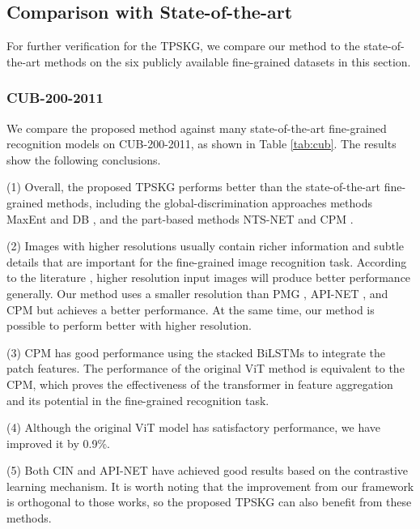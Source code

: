 \documentclass[5p,twocolumn]{elsarticle}
\begin{document}
\subsection{Comparison with State-of-the-art}
For further verification for the TPSKG, we compare our method to the state-of-the-art methods on the six publicly available fine-grained datasets in this section.

\subsubsection{\textbf{CUB-200-2011}}
We compare the proposed method against many state-of-the-art fine-grained recognition models on CUB-200-2011, as shown in Table \ref{tab:cub}. The results show the following conclusions.

(1) Overall, the proposed TPSKG performs better than the state-of-the-art fine-grained methods, including the global-discrimination approaches methods MaxEnt \cite{Dubey2018Maximum} and DB \cite{Sun2020Fine}, and the part-based methods NTS-NET \cite{Yang2018Learning} and CPM \cite{Ge2019Weakly}. 

(2) Images with higher resolutions usually contain richer information and subtle details that are important for the fine-grained image recognition task.  According to the literature \cite{Cui2018Large}, higher resolution input images will produce better performance generally. Our method uses a smaller resolution than PMG \cite{Du2020Fine}, API-NET \cite{Zhuang2020Learning}, and CPM \cite{Ge2019Weakly} but achieves a better performance. At the same time, our method is possible to perform better with higher resolution. 

(3) CPM \cite{Ge2019Weakly} has good performance using the stacked BiLSTMs to integrate the patch features. The performance of the original ViT method is equivalent to the CPM, which proves the effectiveness of the transformer in feature aggregation and its potential in the fine-grained recognition task. 

(4) Although the original ViT model has satisfactory performance, we have improved it by 0.9\%. 

(5) Both CIN \cite{Gao2020Channel} and API-NET \cite{Zhuang2020Learning} have achieved good results based on the contrastive learning mechanism. It is worth noting that the improvement from our framework is orthogonal to those works, so the proposed TPSKG  can also benefit from these methods.
\end{document}
